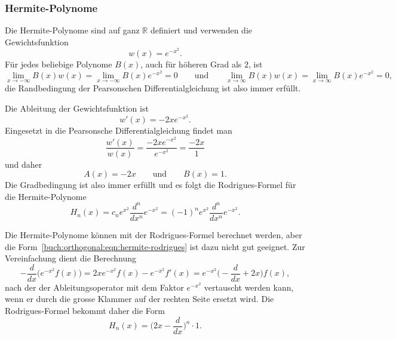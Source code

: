 %
%
\subsubsection{Hermite-Polynome}
Die Hermite-Polynome sind auf ganz $\mathbb{R}$ definiert und verwenden
die Gewichtsfunktion
\[
w(x) = e^{-x^2}.
\]
Für jedes beliebige Polynome $B(x)$, auch für höheren Grad als $2$, ist
\[
\lim_{x\to-\infty} B(x) w(x)
=
\lim_{x\to-\infty} B(x)e^{-x^2}
=
0
\qquad\text{und}\qquad
\lim_{x\to\infty} B(x) w(x)
=
\lim_{x\to\infty} B(x)e^{-x^2}
=
0,
\]
die Randbedingung der Pearsonschen Differentialgleichung ist also
immer erfüllt.

Die Ableitung der Gewichtsfunktion ist
\[
w'(x) = -2xe^{-x^2}.
\]
Eingesetzt in die Pearsonsche Differentialgleichung findet man
\[
\frac{w'(x)}{w(x)}
=
\frac{-2xe^{-x^2}}{e^{-x^2}}
=
\frac{-2x}{1}
\]
und daher
\[
A(x) = -2x
\qquad\text{und}\qquad
B(x) = 1.
\]
Die Gradbedingung ist also immer erfüllt und es folgt die Rodrigues-Formel
für die Hermite-Polynome
%
%
\begin{equation}
H_n(x)
=
c_n
e^{x^2}\frac{d^n}{dx^n} e^{-x^2}
=
(-1)^n
e^{x^2}\frac{d^n}{dx^n} e^{-x^2}.
\label{buch:orthogonal:eqn:hermite-rodrigues}
\end{equation}

Die Hermite-Polynome können mit der Rodrigues-Formel berechnet werden,
aber die Form~\eqref{buch:orthogonal:eqn:hermite-rodrigues} ist dazu
nicht gut geeignet.
Zur Vereinfachung dient die Berechnung 
\[
-\frac{d}{dx}
\bigl(
e^{-x^2}f(x)
\bigr)
=
2xe^{-x^2}f(x)
-
e^{-x^2}f'(x)
=
e^{-x^2}
\biggl(-\frac{d}{dx}+2x\biggr)
f(x),
\]
nach der der Ableitungsoperator mit dem Faktor $e^{-x^2}$ 
vertauscht werden kann, wenn er durch die grosse Klammer auf der
rechten Seite ersetzt wird.
Die Rodrigues-Formel bekommt daher die Form
\[
H_n(x) = \biggl(2x-\frac{d}{dx}\biggr)^n \cdot 1.
\]



%
%
